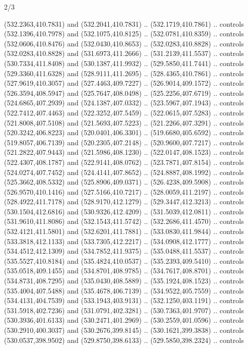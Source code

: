 \begin{flagdescription}{2/3}
\begin{scope}[xshift=0.5\flaglength,yshift=0.5\flagwidth,scale=\flagwidth/495.65]
\begin{scope}[y=0.8pt, x=0.8pt, yscale=-1,shift={(-463.76,-309.78)}]
  (532.2363,410.7831) and (532.2041,410.7831) .. (532.1719,410.7861) .. controls
  (532.1396,410.7978) and (532.1075,410.8125) .. (532.0781,410.8359) .. controls
  (532.0606,410.8476) and (532.0430,410.8653) .. (532.0283,410.8828) .. controls
  (532.0283,410.8828) and (531.6973,411.2666) .. (531.2139,411.5537) .. controls
  (530.7334,411.8408) and (530.1387,411.9932) .. (529.5850,411.7441) .. controls
  (529.3360,411.6328) and (528.9111,411.2695) .. (528.4365,410.7861) .. controls
  (527.9619,410.3057) and (527.4463,409.7227) .. (526.9014,409.1572) .. controls
  (526.3594,408.5947) and (525.7647,408.0498) .. (525.2256,407.6719) .. controls
  (524.6865,407.2939) and (524.1387,407.0332) .. (523.5967,407.1943) .. controls
  (522.7412,407.4463) and (522.3252,407.5459) .. (522.0615,407.5283) .. controls
  (521.8008,407.5108) and (521.5693,407.5223) .. (521.2266,407.3291) .. controls
  (520.3242,406.8223) and (520.0401,406.3301) .. (519.6680,405.6592) .. controls
  (519.8057,406.7139) and (520.2305,407.2148) .. (520.9600,407.7217) .. controls
  (521.2822,407.9443) and (521.5986,408.1230) .. (522.0147,408.1523) .. controls
  (522.4307,408.1787) and (522.9141,408.0762) .. (523.7871,407.8154) .. controls
  (524.0274,407.7452) and (524.4141,407.8652) .. (524.8887,408.1992) .. controls
  (525.3662,408.5332) and (525.8906,409.0371) .. (526.4238,409.5908) .. controls
  (526.9570,410.1416) and (527.5166,410.7217) .. (528.0059,411.2197) .. controls
  (528.4922,411.7178) and (528.9170,412.1279) .. (529.3447,412.3213) .. controls
  (530.1504,412.6816) and (530.9326,412.4209) .. (531.5039,412.0811) .. controls
  (531.9610,411.8086) and (532.1543,411.5742) .. (532.2686,411.4570) .. controls
  (532.4121,411.5801) and (532.6201,411.7881) .. (533.0830,411.9844) .. controls
  (533.3818,412.1133) and (533.7305,412.2217) .. (534.0908,412.1777) .. controls
  (534.4512,412.1309) and (534.7852,411.9375) .. (535.0488,411.5537) .. controls
  (535.5527,410.8184) and (535.4824,410.0537) .. (535.2393,409.5410) .. controls
  (535.0518,409.1455) and (534.8701,408.9785) .. (534.7617,408.8701) .. controls
  (534.8731,408.7295) and (535.0430,408.5889) .. (535.1924,408.1523) .. controls
  (535.4004,407.5488) and (535.4678,406.7139) .. (534.9522,405.7559) .. controls
  (534.4131,404.7539) and (533.1943,403.9131) .. (532.1250,403.1191) .. controls
  (531.5918,402.7236) and (531.0791,402.3281) .. (530.7363,401.9707) .. controls
  (530.3936,401.6133) and (530.2471,401.2969) .. (530.2559,401.0596) .. controls
  (530.2910,400.3037) and (530.2676,399.8145) .. (530.1621,399.3838) .. controls
  (530.0537,398.9502) and (529.8750,398.6133) .. (529.5850,398.2324) .. controls

\end{scope}
\end{scope}
\end{flagdescription}
